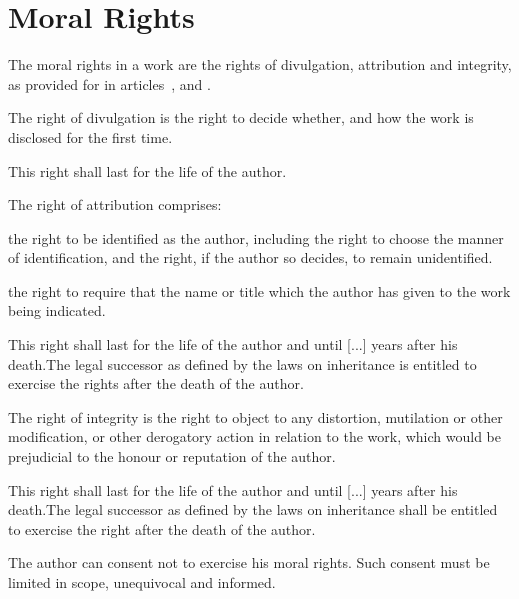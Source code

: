 \section{Moral Rights}
\begin{contract}
\label{Par:MoralRightsGeneral}
\Sentence The moral rights in a work are the rights of divulgation, attribution and
integrity, as provided for in articles~,  and .

\label{Par:RightOfDivulgation}
\Sentence The right of divulgation is the right to decide whether, and how the work is disclosed for the first time.

\Sentence This right shall last for the life of the author.

\label{Par:RightOfAttribution}
\Sentence  The right of attribution comprises:
\begin{legalenum}
	\item the right to be identified as the author, including the right to choose
				the manner of identification, and the right, if the author so decides,
				to remain unidentified.
	\item the right to require that the name or title which the author has given to
				the work being indicated.
\end{legalenum}

\Sentence This right shall last for the life of the author and until [...] years after his
death.\Sentence The legal successor as defined by the laws on inheritance is
entitled to exercise the rights after the death of the author.

\label{Par:RightOfIntegrity}
\Sentence  The right of integrity is the right to object to any distortion, mutilation
or other modification, or other derogatory action in relation to the work,
which would be prejudicial to the honour or reputation of the author.

\Sentence This right shall last for the life of the author and until [...] years after his
death.\Sentence The legal successor as defined by the laws on inheritance shall be
entitled to exercise the right after the death of the author.

\label{Par:Consent}
\Sentence The author can consent not to exercise his moral rights. \Sentence Such consent must be limited in scope, unequivocal and informed.


\end{contract}
